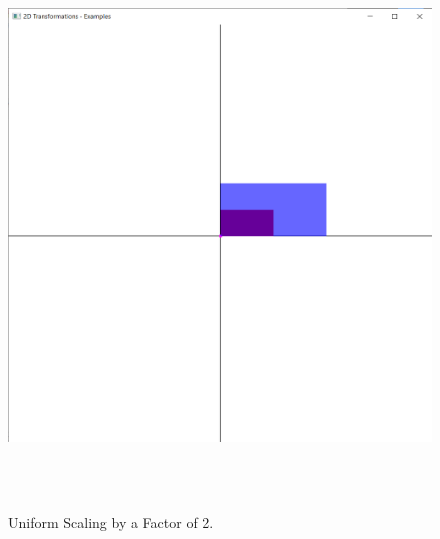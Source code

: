 \documentclass[12pt, a4]{article}
\begin{document}
\subsection*{}
\begin{figure}[h]
\centering
\caption{Uniform Scaling by a Factor of 2.}
\includegraphics[height=15cm, width=15cm]{Outputs/Output-9.png}
\end{figure}

\newpage
\end{document}
